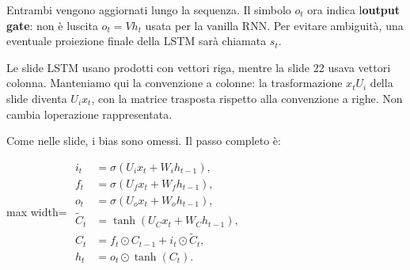 \documentclass[11pt,a4paper,oneside,openany]{book}
\begin{document}
Entrambi vengono aggiornati lungo la sequenza. Il simbolo \(o_t\) ora indica l\textquotesingle{}\textbf{output gate}: non è l\textquotesingle uscita \(o_t=Vh_t\) usata per la vanilla RNN. Per evitare ambiguità, una eventuale proiezione finale della LSTM sarà chiamata \(s_t\).

Le slide LSTM usano prodotti con vettori riga, mentre la slide 22 usava vettori colonna. Manteniamo qui la convenzione a colonne: la trasformazione \(x_tU_i\) della slide diventa \(U_ix_t\), con la matrice trasposta rispetto alla convenzione a righe. Non cambia l\textquotesingle operazione rappresentata.

Come nelle slide, i bias sono omessi. Il passo completo è:

\begin{center}
\begin{adjustbox}{max width=\linewidth}
$\displaystyle 
\boxed{\begin{aligned}
i_t&=\sigma(U_ix_t+W_ih_{t-1}),\\
f_t&=\sigma(U_fx_t+W_fh_{t-1}),\\
o_t&=\sigma(U_ox_t+W_oh_{t-1}),\\
\widetilde C_t&=\tanh(U_Cx_t+W_Ch_{t-1}),\\
C_t&=f_t\odot C_{t-1}+i_t\odot\widetilde C_t,\\
h_t&=o_t\odot\tanh(C_t).
\end{aligned}}
$
\end{adjustbox}
\end{center}
\end{document}
